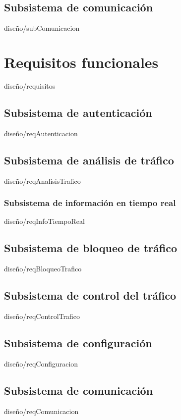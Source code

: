 \documentclass[epsbased,copyright,final,printable,covers,extendedindex,firstnumbered,tfg,gnuplot]{tfgtfmthesisuam}
\begin{document}
        \subsection{Subsistema de comunicación\label{SEC:subComunicacion}}{diseño/subComunicacion}
        
        

    \section{Requisitos funcionales\label{SEC:requisitos}}{diseño/requisitos}
        \subsection{Subsistema de autenticación\label{SEC:reqAutenticacion}}{diseño/reqAutenticacion}
        \subsection{Subsistema de análisis de tráfico\label{SEC:reqAnalisisTrafico}}{diseño/reqAnalisisTrafico}
            \subsubsection{Subsistema de información en tiempo real\label{SEC:reqInfoTiempoReal}}{diseño/reqInfoTiempoReal}
        \subsection{Subsistema de bloqueo de tráfico\label{SEC:reqBloqueoTrafico}}{diseño/reqBloqueoTrafico}
        \subsection{Subsistema de control del tráfico\label{SEC:reqControlTrafico}}{diseño/reqControlTrafico}
        \subsection{Subsistema de configuración\label{SEC:reqConfiguracion}}{diseño/reqConfiguracion}
        \subsection{Subsistema de comunicación\label{SEC:reqComunicacion}}{diseño/reqComunicacion}
        
\end{document}

